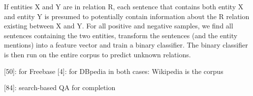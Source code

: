 If entities X and Y are in relation R, each sentence that contains both
entity X and entity Y is presumed to potentially contain information about
the R relation existing between X and Y.
For all positive and negative samples, we find all sentences containing the two
entities, transform the sentences (and the entity mentions) into a feature
vector and train a binary classifier.
The binary classifier is then run on the entire corpus to predict unknown
relations.

[50]: for Freebase
[4]: for DBpedia
in both cases: Wikipedia is the corpus

[84]: search-based QA for completion
